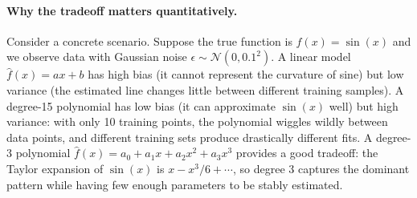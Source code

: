 \paragraph{Why the tradeoff matters quantitatively.} Consider a concrete scenario. Suppose the true function is $f(x) = \sin(x)$ and we observe data with Gaussian noise $\epsilon \sim \mathcal{N}(0, 0.1^2)$. A linear model $\hat{f}(x) = ax + b$ has high bias (it cannot represent the curvature of sine) but low variance (the estimated line changes little between different training samples). A degree-15 polynomial has low bias (it can approximate $\sin(x)$ well) but high variance: with only 10 training points, the polynomial wiggles wildly between data points, and different training sets produce drastically different fits. A degree-3 polynomial $\hat{f}(x) = a_0 + a_1 x + a_2 x^2 + a_3 x^3$ provides a good tradeoff: the Taylor expansion of $\sin(x)$ is $x - x^3/6 + \cdots$, so degree 3 captures the dominant pattern while having few enough parameters to be stably estimated.

\begin{center}
\end{center}


